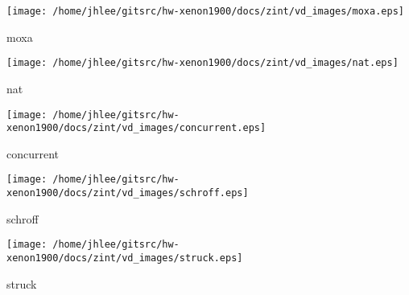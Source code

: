 \noindent
\vspace{1.4cm}
\begin{minipage}{.2\textwidth}
\begin{center}
\texttt{[image: /home/jhlee/gitsrc/hw-xenon1900/docs/zint/vd\_images/moxa.eps]}
\end{center}
\end{minipage}
\begin{minipage}{.7\textwidth}
moxa
\end{minipage}


\noindent
\vspace{1.4cm}
\begin{minipage}{.2\textwidth}
\begin{center}
\texttt{[image: /home/jhlee/gitsrc/hw-xenon1900/docs/zint/vd\_images/nat.eps]}
\end{center}
\end{minipage}
\begin{minipage}{.7\textwidth}
nat
\end{minipage}


\noindent
\vspace{1.4cm}
\begin{minipage}{.2\textwidth}
\begin{center}
\texttt{[image: /home/jhlee/gitsrc/hw-xenon1900/docs/zint/vd\_images/concurrent.eps]}
\end{center}
\end{minipage}
\begin{minipage}{.7\textwidth}
concurrent
\end{minipage}


\noindent
\vspace{1.4cm}
\begin{minipage}{.2\textwidth}
\begin{center}
\texttt{[image: /home/jhlee/gitsrc/hw-xenon1900/docs/zint/vd\_images/schroff.eps]}
\end{center}
\end{minipage}
\begin{minipage}{.7\textwidth}
schroff
\end{minipage}


\noindent
\vspace{1.4cm}
\begin{minipage}{.2\textwidth}
\begin{center}
\texttt{[image: /home/jhlee/gitsrc/hw-xenon1900/docs/zint/vd\_images/struck.eps]}
\end{center}
\end{minipage}
\begin{minipage}{.7\textwidth}
struck
\end{minipage}


